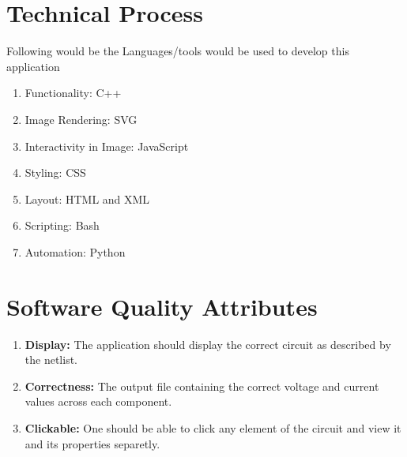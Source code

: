 \documentclass[12pt]{extarticle}
\begin{document}
\section{Technical Process}
Following would be the Languages/tools would be used to develop this application
\begin{enumerate}
\item Functionality: C++
\item Image Rendering: SVG
\item Interactivity in Image: JavaScript
\item Styling: CSS
\item Layout: HTML and XML
\item Scripting: Bash
\item Automation: Python
\end{enumerate}

\section{Software Quality Attributes}
\begin{enumerate}
\item \textbf{Display:} The application should display the correct circuit as described by the netlist.
\item \textbf{Correctness:} The output file containing the correct voltage and current values across each component.
\item \textbf{Clickable:} One should be able to click any element of the circuit and view it and its properties separetly.

\end{enumerate}
\end{document}
